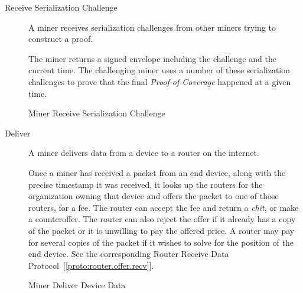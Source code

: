 \documentclass[10pt, nonatbib, nocopyrightspace, reprint]{sigplanconf}
\begin{document}
\begin{description}
  \item [Receive Serialization Challenge] A miner receives serialization challenges from other miners trying to construct a proof.

    The miner returns a signed envelope including the challenge and the current time. The challenging miner uses a number of these serialization challenges to prove that the final \emph{Proof-of-Coverage} happened at a given time.

    \begin{algorithm}[!htb]
      \DontPrintSemicolon
      \caption{Miner Receive Serialization Challenge}\label{proto:miner.recv.challenge.serialization}

    \end{algorithm}
    \FloatBarrier

  \item [Deliver] A miner delivers data from a device to a router on the internet.

    Once a miner has received a packet from an end device, along with the precise timestamp it was received, it looks up the routers for the organization owning that device and offers the packet to one of those routers, for a fee. The router can accept the fee and return a \emph{chit}, or make a counteroffer. The router can also reject the offer if it already has a copy of the packet or it is unwilling to pay the offered price. A router may pay for several copies of the packet if it wishes to solve for the position of the end device. See the corresponding Router Receive Data Protocol~[\ref{proto:router.offer.recv}].

    \begin{algorithm}[!htb]
      \DontPrintSemicolon
      \caption{Miner Deliver Device Data}\label{proto:miner.data.deliver}


\end{algorithm}
\end{description}
\end{document}
